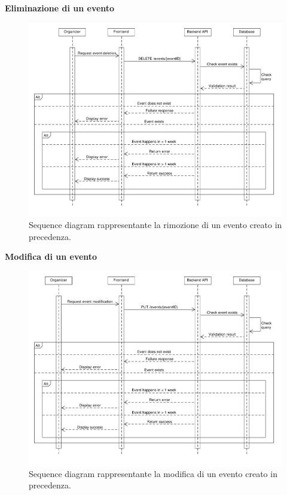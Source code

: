 \documentclass[9pt]{extarticle}
\begin{document}
\newpage
\textbf{Eliminazione di un evento}
\begin{figure}[!htb]
	\centering
	\includegraphics[width=\linewidth]{./images/SequenceDiagramEventDeletion.pdf}
	\caption{Sequence diagram rappresentante la rimozione di un evento creato in precedenza.}
	\label{fig:SeqDiagEventDeletion}
\end{figure}

\newpage
\textbf{Modifica di un evento}
\begin{figure}[!htb]
	\centering
	\includegraphics[width=\linewidth]{./images/SequenceDiagramEventModification.pdf}
	\caption{Sequence diagram rappresentante la modifica di un evento creato in precedenza.}
	\label{fig:SeqDiagEventModification}
\end{figure}
\end{document}
